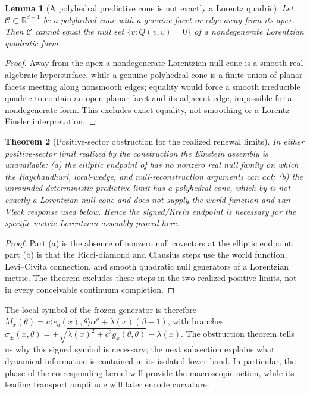 \documentclass[11pt]{article}
\newtheorem{theorem}{Theorem}[section]
\newtheorem{lemma}[theorem]{Lemma}
\theoremstyle{definition}
\theoremstyle{remark}
\newcommand{\R}{\mathbb R}
\begin{document}
\begin{lemma}[A polyhedral predictive cone is not exactly a Lorentz quadric]
\label{lem:poly-not-quad}
Let $\mathcal C\subset\R^{d+1}$ be a polyhedral cone with a genuine facet or edge
away from its apex.  Then $\mathcal C$ cannot equal the null set
$\{v:Q(v,v)=0\}$ of a nondegenerate Lorentzian quadratic form.
\end{lemma}

\begin{proof}
Away from the apex a nondegenerate Lorentzian null cone is a smooth real
algebraic hypersurface, while a genuine polyhedral cone is a finite union of
planar facets meeting along nonsmooth edges; equality would force a smooth
irreducible quadric to contain an open planar facet and its adjacent edge,
impossible for a nondegenerate form.  This excludes exact equality, not
smoothing or a Lorentz--Finsler interpretation.
\end{proof}

\begin{theorem}[Positive-sector obstruction for the realized renewal limits]
\label{thm:positive-obstruction}
In either positive-sector limit realized by the construction the Einstein
assembly is unavailable: \textup{(a)} the elliptic endpoint of
 has no nonzero real null family on which the
Raychaudhuri, local-wedge, and null-reconstruction arguments can act; \textup{(b)}
the unrounded deterministic predictive limit has a polyhedral cone, which by
 is not exactly a Lorentzian null cone and does not
supply the world function and van Vleck response used below.  Hence the
signed/Krein endpoint is necessary for the specific metric-Lorentzian assembly
proved here.
\end{theorem}

\begin{proof}
Part (a) is the absence of nonzero null covectors at the elliptic endpoint; part
(b) is that the Ricci-diamond and Clausius steps use the world function,
Levi--Civita connection, and smooth quadratic null generators of a Lorentzian
metric.  The theorem excludes these steps in the two realized positive limits, not
in every conceivable continuum completion.
\end{proof}

The local symbol of the frozen generator is therefore
$M_x(\theta)=c\langle e_a(x),\theta\rangle\alpha^a+\lambda(x)(\beta-1)$, with
branches $\sigma_\pm(x,\theta)=\pm\sqrt{\lambda(x)^2+c^2g_x(\theta,\theta)}-\lambda(x)$.
The obstruction theorem tells us why this signed symbol is necessary; the next
subsection explains what dynamical information is contained in its isolated
lower band.  In particular, the phase of the corresponding kernel will provide
the macroscopic action, while its leading transport amplitude will later encode
curvature.
\end{document}
